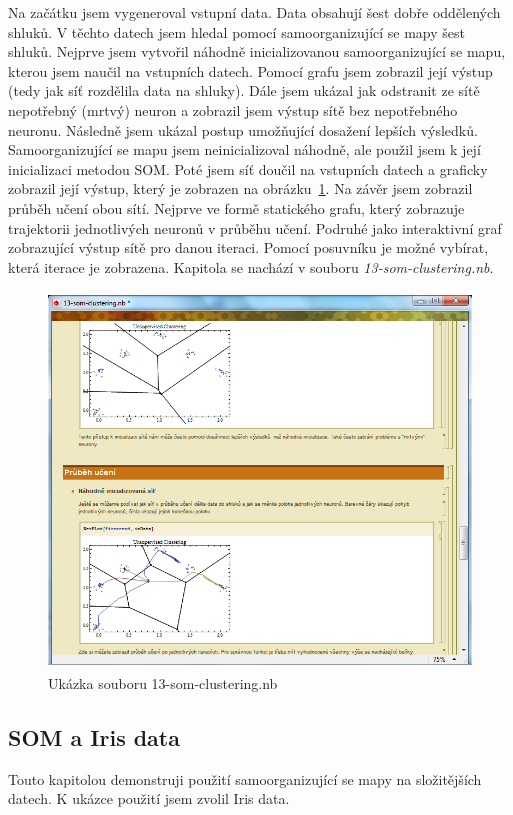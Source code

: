 \documentclass[11pt,twoside,a4paper]{book}
\begin{document}
Na začátku jsem vygeneroval vstupní data. Data obsahují šest dobře oddělených shluků. V těchto datech jsem hledal pomocí samoorganizující se mapy šest shluků. Nejprve jsem vytvořil náhodně inicializovanou samoorganizující se mapu, kterou jsem naučil na vstupních datech. Pomocí grafu jsem zobrazil její výstup (tedy jak síť rozdělila data na shluky). Dále jsem ukázal jak odstranit ze sítě nepotřebný (mrtvý) neuron a zobrazil jsem výstup sítě bez nepotřebného neuronu. Následně jsem ukázal postup umožňující dosažení lepších výsledků. Samoorganizující se mapu jsem neinicializoval náhodně, ale použil jsem k její inicializaci metodou SOM. Poté jsem síť doučil na vstupních datech a graficky zobrazil její výstup, který je zobrazen na obrázku~\ref{fig:som-clustering}. Na závěr jsem zobrazil průběh učení obou sítí. Nejprve ve formě statického grafu, který zobrazuje trajektorii jednotlivých neuronů v průběhu učení. Podruhé jako interaktivní graf zobrazující výstup sítě pro danou iteraci. Pomocí posuvníku je možné vybírat, která iterace je zobrazena. Kapitola se nachází v souboru \textit{13-som-clustering.nb}.

\begin{figure}[h!]
\begin{center}
\includegraphics[height=10cm]{figures/ukazka13.png}
\caption{Ukázka souboru 13-som-clustering.nb}
\label{fig:som-clustering}
\end{center}
\end{figure}

\subsection{SOM a Iris data}
Touto kapitolou demonstruji použití samoorganizující se mapy na složitějších datech. K ukázce použití jsem zvolil Iris data.
\end{document}

